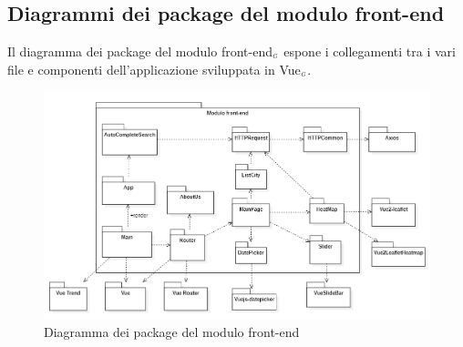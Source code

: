 \subsection{Diagrammi dei package del modulo front-end}\label{DiagrammaPackageFrontEnd}
Il diagramma dei package del modulo front-end$_{\scaleto{G}{3pt}}$ espone i collegamenti tra i vari file e componenti dell'applicazione sviluppata in Vue$_{\scaleto{G}{3pt}}$.
\begin{center}
	\begin{figure}[H]
		\centering\includegraphics[scale=0.7]{../immagini/diag_PB/diag_pack_vue.png}
		\caption{Diagramma dei package del modulo front-end}
	\end{figure}
\end{center}

